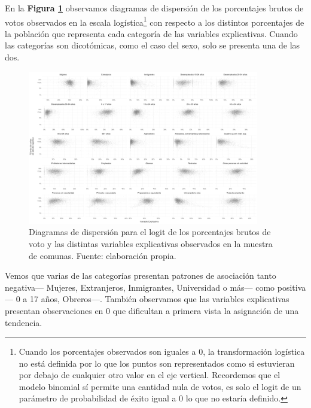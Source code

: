 En la \textbf{Figura \ref{fig:Disper_Voto_Variables}} observamos diagramas de dispersión de los porcentajes brutos de votos observados en la escala logística\footnote{Cuando los porcentajes observados son iguales a 0, la transformación logística no está definida por lo que los puntos son representados como si estuvieran por debajo de cualquier otro valor en el eje vertical. Recordemos que el modelo binomial sí permite una cantidad nula de votos, es solo el logit de un parámetro de probabilidad de éxito igual a 0 lo que no estaría definido.} con respecto a los distintos porcentajes de la población que representa cada categoría de las variables explicativas. Cuando las categorías son dicotómicas, como el caso del sexo, solo se presenta una de las dos.\\ 

\begin{figure}[h]
	\centering
	\includegraphics[width = 0.9\textwidth]{Figs/AED/Asociaciones_MUESTRA}
	\caption{Diagramas de dispersión para el logit de los porcentajes brutos de voto y las distintas variables explicativas observados en la muestra de comunas. Fuente: elaboración propia.}
	\label{fig:Disper_Voto_Variables}	
\end{figure}

Vemos que varias de las categorías presentan patrones de asociación tanto negativa--- Mujeres, Extranjeros, Inmigrantes, Universidad o más--- como positiva--- 0 a 17 años, Obreros---. También observamos que las variables explicativas presentan observaciones en 0 que dificultan a primera vista la asignación de una tendencia.\\

